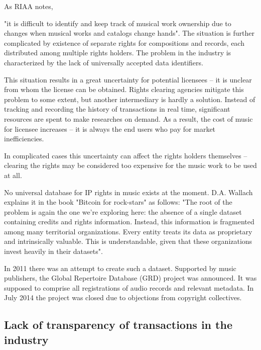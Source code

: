 \documentclass[12pt]{report}
\begin{document}
As RIAA notes, 
\begin{framed}
"it is difficult to identify and keep track of musical work ownership due to changes when musical works and catalogs change hands". The situation is further complicated by existence of separate rights for compositions and records, each distributed among multiple rights holders. The problem in the industry is characterized by the lack of universally accepted data identifiers.
 
This situation results in a great uncertainty for potential licensees – it is unclear from whom the license can be obtained. Rights clearing agencies mitigate this problem to some extent, but another intermediary is hardly a solution. Instead of tracking and recording the history of transactions in real time, significant resources are spent to make researches on demand. As a result, the cost of music for licensee increases – it is always the end users who pay for market inefficiencies.
 
In complicated cases this uncertainty can affect the rights holders themselves – clearing the rights may be considered too expensive for the music work to be used at all.
 
No universal database for IP rights in music exists at the moment. D.A. Wallach explains it in the book "Bitcoin for rock-stars" as follows: "The root of the problem is again the one we’re exploring here: the absence of a single dataset containing credits and rights information. Instead, this information is fragmented among many territorial organizations. Every entity treats its data as proprietary and intrinsically valuable. This is understandable, given that these organizations invest heavily in their datasets".
\end{framed}
 
In 2011 there was an attempt to create such a dataset. Supported by music publishers, the Global Repertoire Database (GRD) project was announced. It was supposed to comprise all registrations of audio records and relevant metadata. In July 2014 the project was closed due to objections from copyright collectives.

\subsection{Lack of transparency of transactions in the industry}
\end{document}
